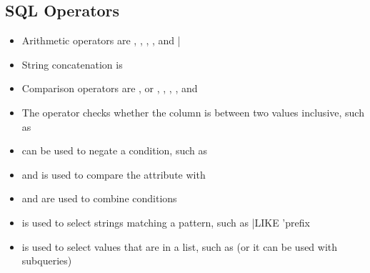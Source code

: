 \documentclass[a4paper]{article}
\begin{document}
\subsection{SQL Operators}
\begin{itemize}
    \item Arithmetic operators are \ilsql{+}, \ilsql{-}, \ilsql{*}, \ilsql{/}, and \ilsql|%
    \item String concatenation is \ilsql{||}
    \item Comparison operators are \ilsql{=}, \ilsql{!=} or \ilsql{<>}, \ilsql{<}, \ilsql{>}, \ilsql{>=}, and \ilsql{<=}
    \item The  operator checks whether the column is between two values inclusive, such as 
    \item {} can be used to negate a condition, such as 
    \item {} and  is used to compare the attribute with 
    \item {} and  are used to combine conditions
    \item {} is used to select strings matching a pattern, such as \ilsql|LIKE 'prefix%
    \item {} is used to select values that are in a list, such as  (or it can be used with subqueries)
\end{itemize}
\end{document}
